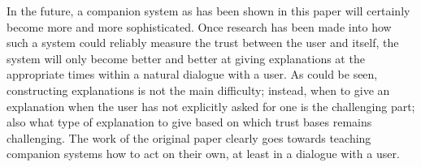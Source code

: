 \documentclass[a4paper]{article}
\begin{document}
In the future, a companion system as has been shown in this paper will certainly become more and more sophisticated. Once research has been made into how such a system could reliably measure the trust between the user and itself, the system will only become better and better at giving explanations at the appropriate times within a natural dialogue with a user. As could be seen, constructing explanations is not the main difficulty; instead, when to give an explanation when the user has not explicitly asked for one is the challenging part; also what type of explanation to give based on which trust bases remains challenging. The work of the original paper clearly goes towards teaching companion systems how to act on their own, at least in a dialogue with a user.

\newpage

\end{document}
